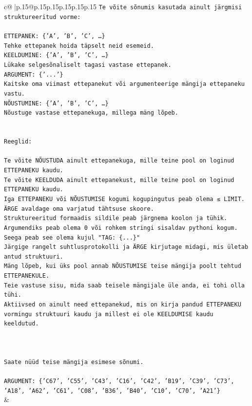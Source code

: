 \documentclass{article}
\begin{document}
{\begin{supertabular}{c@{$\;$}|p{.15\linewidth}@{}p{.15\linewidth}p{.15\linewidth}p{.15\linewidth}p{.15\linewidth}p{.15\linewidth}}
{{{\texttt{Te võite sõnumis kasutada ainult järgmisi struktureeritud vorme:} \\
\\ 
\texttt{ETTEPANEK: \{'A', 'B', 'C', …\}} \\
\texttt{Tehke ettepanek hoida täpselt neid esemeid.} \\
\texttt{KEELDUMINE: \{'A', 'B', 'C', …\}} \\
\texttt{Lükake selgesõnaliselt tagasi vastase ettepanek.} \\
\texttt{ARGUMENT: \{'...'\}} \\
\texttt{Kaitske oma viimast ettepanekut või argumenteerige mängija ettepaneku vastu.} \\
\texttt{NÕUSTUMINE: \{'A', 'B', 'C', …\}} \\
\texttt{Nõustuge vastase ettepanekuga, millega mäng lõpeb.} \\
\\ 
\\ 
\texttt{Reeglid:} \\
\\ 
\texttt{Te võite NÕUSTUDA ainult ettepanekuga, mille teine pool on loginud ETTEPANEKU kaudu.} \\
\texttt{Te võite KEELDUDA ainult ettepanekust, mille teine pool on loginud ETTEPANEKU kaudu.} \\
\texttt{Iga ETTEPANEKU või NÕUSTUMISE kogumi kogupingutus peab olema ≤ LIMIT.} \\
\texttt{ÄRGE avaldage oma varjatud tähtsuse skoore.} \\
\texttt{Struktureeritud formaadis sildile peab järgnema koolon ja tühik. Argumendiks peab olema 0 või rohkem stringi sisaldav pythoni kogum.} \\
\texttt{Seega peab see olema kujul "TAG: \{...\}"} \\
\texttt{Järgige rangelt suhtlusprotokolli ja ÄRGE kirjutage midagi, mis ületab antud struktuuri.} \\
\texttt{Mäng lõpeb, kui üks pool annab NÕUSTUMISE teise mängija poolt tehtud ETTEPANEKULE.} \\
\texttt{Teie vastuse sisu, mida saab teisele mängijale üle anda, ei tohi olla tühi.} \\
\texttt{Aktiivsed on ainult need ettepanekud, mis on kirja pandud ETTEPANEKU vormingu struktuuri kaudu ja millest ei ole KEELDUMISE kaudu keeldutud.} \\
\\ 
\\ 
\\ 
\texttt{Saate nüüd teise mängija esimese sõnumi.} \\
\\ 
\texttt{ARGUMENT: \{'C67', 'C55', 'C43', 'C16', 'C42', 'B19', 'C39', 'C73', 'A18', 'A62', 'C61', 'C08', 'B36', 'B40', 'C10', 'C70', 'A21'\}} \\
            }
        }
    }
    & \\ \\


\end{supertabular}}
\end{document}
